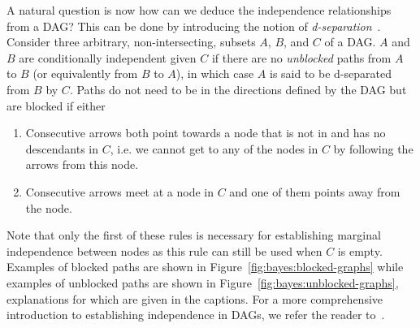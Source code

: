 A natural question is now how can we deduce the independence relationships from a DAG?
This can be done by introducing the notion of \emph{d-separation}~\citep{pearl2014probabilistic}.
Consider three arbitrary, non-intersecting, subsets $A$, $B$, and $C$ of a DAG.  $A$ and $B$
are conditionally independent given $C$ if there are no \emph{unblocked} paths from $A$ to $B$
(or equivalently from $B$ to $A$), in which case $A$ is said to be d-separated from $B$ by $C$.  
Paths do not need to be in the directions defined by the DAG but are blocked if either
\vspace{-5pt}
\begin{enumerate}
		\setlength\itemsep{-0.1em}
	\item Consecutive arrows both point towards a node that is not in and
	has no descendants in $C$, i.e. we cannot get to any of the nodes in $C$ by following the arrows
	from this node.
	\item Consecutive arrows meet at a node in $C$ and one of them
	points away from the node.
\end{enumerate}
\vspace{-5pt}
Note that only the first of these rules is necessary for establishing marginal independence
between nodes as this rule can still be used when $C$ is empty.
Examples of blocked paths are shown in Figure~\ref{fig:bayes:blocked-graphs} while examples of unblocked paths
are shown in Figure~\ref{fig:bayes:unblocked-graphs}, explanations for which are given in the captions.
For a more comprehensive introduction to establishing independence in DAGs, we
refer the reader to~\cite[Section 8.2]{bishop2006pattern}.

